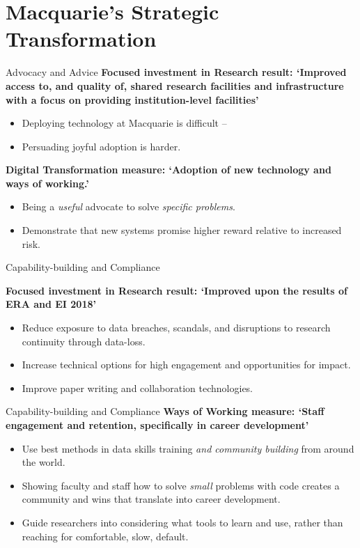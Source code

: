\documentclass[aspectratio=169, 11pt]{beamer} %
\begin{document}
\section{Macquarie's Strategic Transformation}

\begin{frame}{Advocacy and Advice}
\textbf{Focused investment in Research result: `Improved access to, and quality of, shared research facilities and infrastructure with a focus on providing institution-level facilities'}

\begin{itemize}
    \item Deploying technology at Macquarie is difficult --
    \item Persuading joyful adoption is harder.
\end{itemize}

\textbf{Digital Transformation measure: `Adoption of new technology and ways of working.'}
\begin{itemize}
    \item Being a \textit{useful} advocate to solve \textit{specific problems}.
    \item Demonstrate that new systems promise higher reward relative to increased risk.
\end{itemize}
\end{frame}

\begin{frame}{Capability-building and Compliance}

\textbf{Focused investment in Research result: `Improved upon the results of ERA and EI 2018'}

\begin{itemize}
    \item Reduce exposure to data breaches,  scandals, and disruptions to research continuity through data-loss.
    \item Increase technical options for high engagement and opportunities for impact.
    \item Improve paper writing and collaboration technologies.
\end{itemize}
\end{frame}

\begin{frame}{Capability-building and Compliance}
\textbf{Ways of Working measure: `Staff engagement and retention, specifically in career development'}
\begin{itemize}
    \item Use best methods in data skills training \textit{and community building} from around the world.
    \item Showing faculty and staff how to solve \textit{small} problems with code creates a community and wins that translate into career development.
    \item Guide researchers into considering what tools to learn and use, rather than reaching for comfortable, slow, default.
\end{itemize}
\end{frame}
\end{document}

